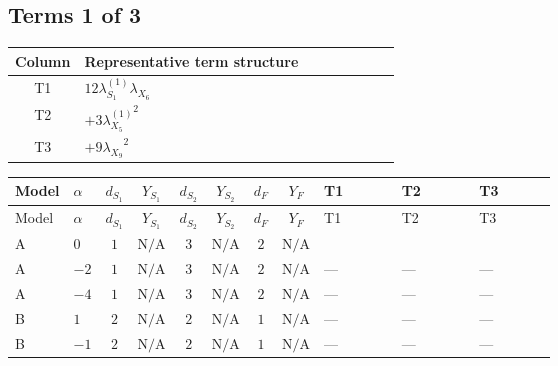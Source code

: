 \documentclass[8pt]{article}
\begin{document}
\begin{landscape}
\subsection*{Terms 1 of 3}
\begin{center}
\begin{tabular}{@{}c >{\raggedright\arraybackslash}p{0.82\linewidth}@{}}
\toprule
Column & Representative term structure \\
\midrule
T1 & \(\displaystyle 12 {\lambda_{S_1}^{(1)}} {\lambda_{X_{6}}}\) \\
\midrule
T2 & \(\displaystyle +3 {\lambda_{X_{5}}^{(1)}}^2\) \\
\midrule
T3 & \(\displaystyle +9 {\lambda_{X_{9}}}^2\) \\
\midrule
\bottomrule
\end{tabular}
\end{center}
\smallskip
\tiny
\begin{longtable}{@{}llcccccc >{\raggedright\arraybackslash}p{0.21\linewidth} >{\raggedright\arraybackslash}p{0.21\linewidth} >{\raggedright\arraybackslash}p{0.21\linewidth}@{}}
\toprule
Model & $\alpha$ & $d_{S_1}$ & $Y_{S_1}$ & $d_{S_2}$ & $Y_{S_2}$ & $d_F$ & $Y_F$ & T1 & T2 & T3 \\
\midrule
\endfirsthead
\toprule
Model & $\alpha$ & $d_{S_1}$ & $Y_{S_1}$ & $d_{S_2}$ & $Y_{S_2}$ & $d_F$ & $Y_F$ & T1 & T2 & T3 \\
\midrule
\endhead
A & $0$ & $1$ & $\text{N/A}$ & $3$ & $\text{N/A}$ & $2$ & $\text{N/A}$ & \scriptsize\adjustbox{max width=\linewidth}{$\begin{gathered} 12 {\lambda_{S_1}^{(1)}} {\lambda_{X_{6}}}\end{gathered}$} & \scriptsize\adjustbox{max width=\linewidth}{$\begin{gathered} +3 {\lambda_{X_{5}}^{(1)}}^2\end{gathered}$} & \scriptsize\adjustbox{max width=\linewidth}{$\begin{gathered} +9 {\lambda_{X_{9}}}^2\end{gathered}$} \\
\midrule
A & $-2$ & $1$ & $\text{N/A}$ & $3$ & $\text{N/A}$ & $2$ & $\text{N/A}$ & --- & --- & --- \\
\midrule
A & $-4$ & $1$ & $\text{N/A}$ & $3$ & $\text{N/A}$ & $2$ & $\text{N/A}$ & --- & --- & --- \\
\midrule
B & $1$ & $2$ & $\text{N/A}$ & $2$ & $\text{N/A}$ & $1$ & $\text{N/A}$ & --- & --- & --- \\
\midrule
B & $-1$ & $2$ & $\text{N/A}$ & $2$ & $\text{N/A}$ & $1$ & $\text{N/A}$ & --- & --- & --- \\

\end{longtable}
\end{landscape}
\end{document}
